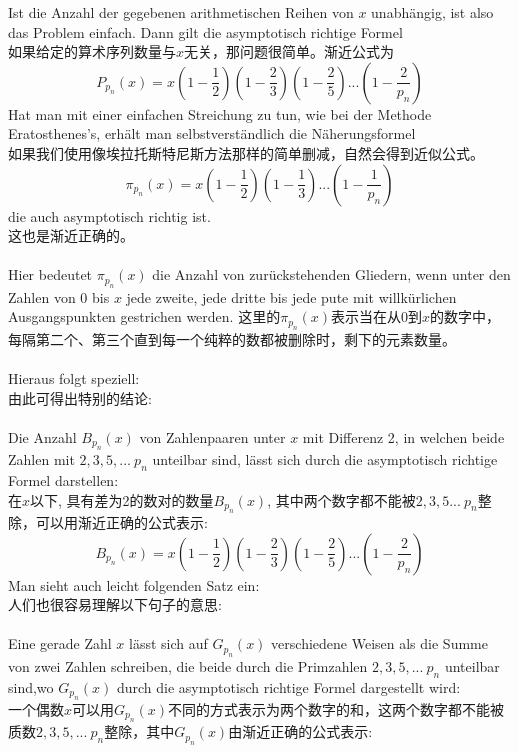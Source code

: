 \documentclass[UTF8,a4paper,zihao=-4]{article}
\begin{document}
\indent Ist die Anzahl der gegebenen arithmetischen Reihen von $x$ unabhängig, ist also das Problem einfach. Dann gilt die asymptotisch richtige Formel\\
\indent 如果给定的算术序列数量与$x$无关，那问题很简单。渐近公式为
$$
P_{p_n}(x)=x\left(1-\frac{1}{2}\right)\left(1-\frac{2}{3}\right)\left(1-\frac{2}{5}\right)...\left(1-\frac{2}{p_n}\right)
$$
Hat man mit einer einfachen Streichung zu tun, wie bei der Methode Eratosthenes's, erhält man selbstverständlich die Näherungsformel\\
如果我们使用像埃拉托斯特尼斯方法那样的简单删减，自然会得到近似公式。
$$
\pi_{p_n}(x)=x\left(1-\frac{1}{2}\right)\left(1-\frac{1}{3}\right)...\left(1-\frac{1}{p_n}\right)
$$
die auch asymptotisch richtig ist.\\
这也是渐近正确的。\\\\
\indent Hier bedeutet $\pi_{p_n}(x)$ die Anzahl von zurückstehenden Gliedern, wenn unter den Zahlen von $0$ bis $x$ jede zweite, jede dritte bis jede pute mit willkürlichen Ausgangspunkten gestrichen werden.
\indent 这里的$\pi_{p_n}(x)$表示当在从$0$到$x$的数字中，每隔第二个、第三个直到每一个纯粹的数都被删除时，剩下的元素数量。\\\\
\indent Hieraus folgt speziell:\\
\indent 由此可得出特别的结论:\\\\
\indent Die Anzahl $B_{p_n}(x)$ von Zahlenpaaren unter $x$ mit Differenz 2, in welchen beide Zahlen mit $2, 3, 5,...\ p_n$ unteilbar sind, lässt sich durch die asymptotisch richtige Formel darstellen:\\
\indent 在$x$以下, 具有差为2的数对的数量$B_{p_n}(x)$, 其中两个数字都不能被$2,3,5...\ p_n$整除，可以用渐近正确的公式表示:
$$
B_{p_n}(x)=x\left(1-\frac{1}{2}\right)\left(1-\frac{2}{3}\right)\left(1-\frac{2}{5}\right)...\left(1-\frac{2}{p_n}\right)
$$
\indent Man sieht auch leicht folgenden Satz ein:\\
\indent 人们也很容易理解以下句子的意思:\\\\
\indent Eine gerade Zahl $x$ lässt sich auf $G_{p_n}(x)$ verschiedene Weisen als die Summe von zwei Zahlen schreiben, die beide durch die Primzahlen $2,3,5,...\ p_n$ unteilbar sind,wo $G_{p_n}(x)$ durch die asymptotisch richtige Formel dargestellt wird:\\
\indent 一个偶数$x$可以用$G_{p_n}(x)$不同的方式表示为两个数字的和，这两个数字都不能被质数$2,3,5,...\ p_n$整除，其中$G_{p_n}(x)$由渐近正确的公式表示:
\end{document}
